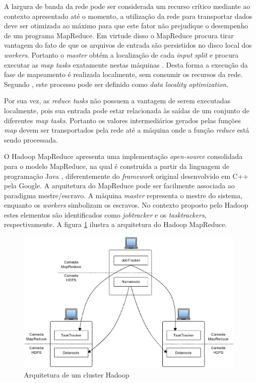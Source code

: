 A largura de banda da rede pode ser considerada um recurso crítico mediante ao contexto apresentado até o momento, a utilização da rede para transportar dados deve ser otimizada ao máximo para que este fator não prejudique o desempenho de um programa MapReduce. Em virtude disso o MapReduce procura tirar vantagem do fato de que os arquivos de entrada são persistidos no disco local dos \textit{workers}. Portanto o \textit{master} obtém a localização de cada \textit{input split} e procura executar as \textit{map tasks} exatamente nestas máquinas \cite{ghemawatMapreduce2008}. Desta forma a execução da fase de mapeamento é realizada localmente, sem consumir os recursos da rede. Segundo , este processo pode ser definido como \textit{data locality optimization}.

Por sua vez, as \textit{reduce tasks} não possuem a vantagem de serem executadas localmente, pois sua entrada pode estar relacionada às saídas de um conjunto de diferentes \textit{map tasks}. Portanto os valores intermediários gerados pelas funções \textit{map} devem ser transportados pela rede até a máquina onde a função \textit{reduce} está sendo processada.

O Hadoop MapReduce apresenta uma implementação \textit{open-source} consolidada para o modelo MapReduce, na qual é construída a partir da linguagem de programação Java \cite{hadoopSiteMapReduce}, diferentemente do \textit{framework} original desenvolvido em C++ pela Google. A arquitetura do MapReduce pode ser facilmente associada ao paradigma mestre/escravo. A máquina \textit{master} representa o mestre do sistema, enquanto os \textit{workers} simbolizam os escravos. No contexto proposto pelo Hadoop estes elementos são identificados como \textit{jobtracker} e os \textit{tasktrackers}, respectivamente. A figura \ref{fig-mapreduce-arquitetura} ilustra a arquitetura do Hadoop MapReduce.

\begin{figure}[ht!]
	\centering
	\includegraphics[keepaspectratio=true,scale=0.6]
	  {figuras/mapreduce-arquitetura.eps}
	\caption{Arquitetura de um cluster Hadoop}
	\label{fig-mapreduce-arquitetura}
\end{figure}

